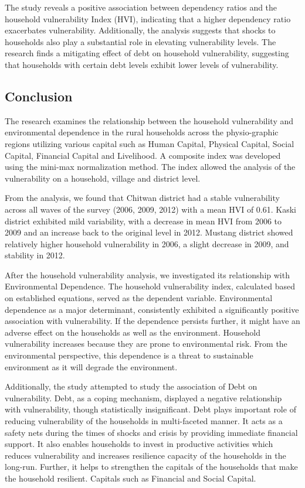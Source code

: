The study reveals a positive association between dependency ratios and the household vulnerability Index (HVI), indicating that a higher dependency ratio exacerbates vulnerability. Additionally, the analysis suggests that shocks to households also play a substantial role in elevating vulnerability levels. The research finds a mitigating effect of debt on household vulnerability, suggesting that households with certain debt levels exhibit lower levels of vulnerability. 

\subsection{Conclusion}
The research examines the relationship between the household vulnerability and environmental dependence in the rural households across the physio-graphic regions utilizing various capital such as Human Capital, Physical Capital, Social Capital, Financial Capital and Livelihood. A composite index was developed using the mini-max normalization method. The index allowed the analysis of the vulnerability on a household, village and district level. 

From the analysis, we found that Chitwan district had a stable vulnerability across all waves of the survey (2006, 2009, 2012) with a mean HVI of 0.61. Kaski district exhibited mild variability, with a decrease in mean HVI from 2006 to 2009 and an increase back to the original level in 2012.
Mustang district showed relatively higher household vulnerability in 2006, a slight decrease in 2009, and stability in 2012. 

After the household vulnerability analysis, we investigated its relationship with Environmental Dependence. The household vulnerability index, calculated based on established equations, served as the dependent variable. Environmental dependence as a major determinant, consistently exhibited a significantly positive association with vulnerability. If the dependence persists further, it might have an adverse effect on the households as well as the environment. Household vulnerability increases because they are prone to environmental risk. From the environmental perspective, this dependence is a threat to sustainable environment as it will degrade the environment.

Additionally, the study attempted to study the association of Debt on vulnerability. Debt, as a coping mechanism, displayed a negative relationship with vulnerability, though statistically insignificant. Debt plays important role of reducing vulnerability of the households in multi-faceted manner. It acts as a safety nets during the times of shocks and crisis by providing immediate financial support. It also enables households to invest in productive activities which reduces vulnerability and increases resilience capacity of the households in the long-run. Further, it helps to strengthen the capitals of the households that make the household resilient. Capitals such as Financial and Social Capital.  

